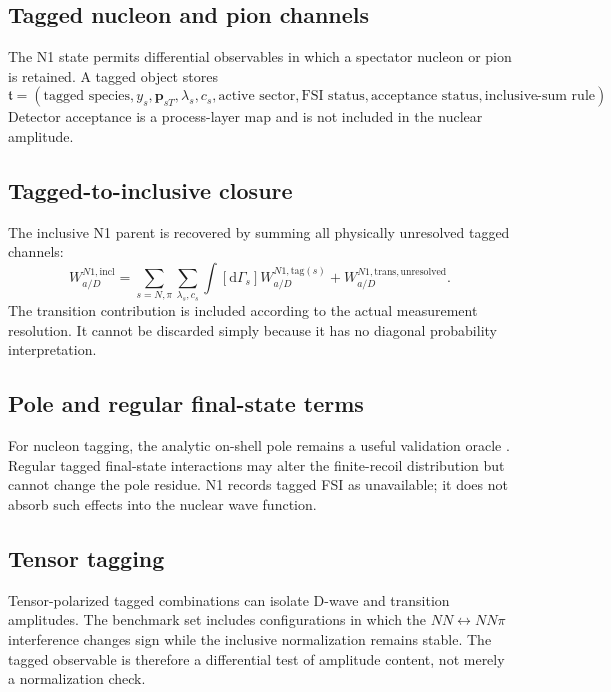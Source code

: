 \documentclass[11pt]{article}
\newcommand{\dd}{\mathrm{d}}
\begin{document}
\subsection{Tagged nucleon and pion channels}

The N1 state permits differential observables in which a spectator nucleon or
pion is retained.  A tagged object stores
\begin{equation}
 \mathfrak t=
 \left(
 \text{tagged species},
 y_s,\bm p_{sT},\lambda_s,c_s,
 \text{active sector},
 \text{FSI status},
 \text{acceptance status},
 \text{inclusive-sum rule}
 \right).
 \label{eq:tagged-id}
\end{equation}
Detector acceptance is a process-layer map and is not included in the nuclear
amplitude.

\subsection{Tagged-to-inclusive closure}

The inclusive N1 parent is recovered by summing all physically unresolved
tagged channels:
\begin{equation}
 W_{a/D}^{N1,\mathrm{incl}}
 =
 \sum_{s=N,\pi}
 \sum_{\lambda_s,c_s}
 \int[\dd\Gamma_s]
 W_{a/D}^{N1,\mathrm{tag}(s)}
 +W_{a/D}^{N1,\mathrm{trans,unresolved}}.
 \label{eq:tagged-inclusive}
\end{equation}
The transition contribution is included according to the actual measurement
resolution.  It cannot be discarded simply because it has no diagonal
probability interpretation.

\subsection{Pole and regular final-state terms}

For nucleon tagging, the analytic on-shell pole remains a useful validation
oracle \cite{CosynWeiss2020,CosynWeiss2026II}.  Regular tagged final-state
interactions may alter the finite-recoil distribution but cannot change the
pole residue.  N1 records tagged FSI as unavailable; it does not absorb such
effects into the nuclear wave function.

\subsection{Tensor tagging}

Tensor-polarized tagged combinations can isolate D-wave and transition
amplitudes.  The benchmark set includes configurations in which the
\(NN\leftrightarrow NN\pi\) interference changes sign while the inclusive
normalization remains stable.  The tagged observable is therefore a
differential test of amplitude content, not merely a normalization check.
\end{document}
